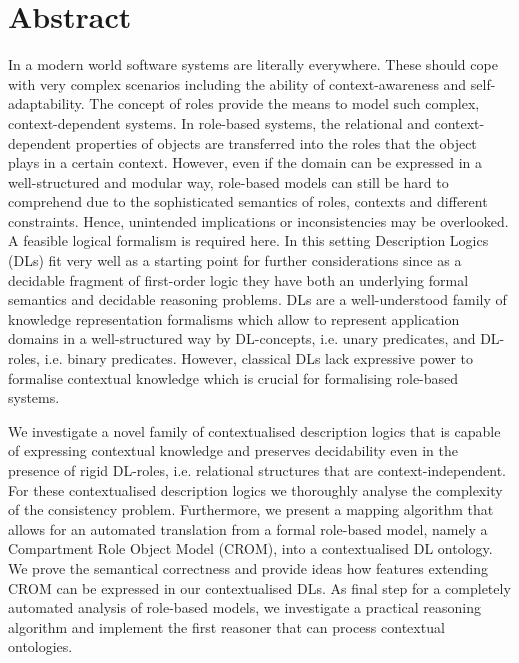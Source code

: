 
\chapter*{Abstract}
In a modern world software systems are literally everywhere. These should cope with very
complex scenarios including the ability of context-awareness and self-adaptability. The concept of
roles provide the means to model such complex, context-dependent systems. In role-based systems, the
relational and context-dependent properties of objects are transferred into the roles that the
object plays in a certain context. However, even if the domain can be expressed in a well-structured
and modular way, role-based models can still be hard to comprehend due to the sophisticated
semantics of roles, contexts and different constraints. Hence, unintended implications or
inconsistencies may be overlooked. A feasible logical formalism is required here. In this setting
Description Logics (DLs) fit very well as a starting point for further considerations since as a
decidable fragment of first-order logic they have both an underlying formal semantics and decidable
reasoning problems. DLs are a well-understood family of knowledge representation formalisms which
allow to represent application domains in a well-structured way by DL-concepts, i.e. unary
predicates, and DL-roles, i.e. binary predicates. However, classical DLs lack expressive power to
formalise contextual knowledge which is crucial for formalising role-based systems.

We investigate a novel family of contextualised description logics that is capable of expressing
contextual knowledge and preserves decidability even in the presence of rigid DL-roles,
i.e. relational structures that are context-independent. For these contextualised description logics
we thoroughly analyse the complexity of the consistency problem.  Furthermore, we present a mapping
algorithm that allows for an automated translation from a formal role-based model, namely a
Compartment Role Object Model (CROM), into a contextualised DL ontology. We prove the semantical
correctness and provide ideas how features extending CROM can be expressed in our contextualised
DLs. As final step for a completely automated analysis of role-based models, we investigate a
practical reasoning algorithm and implement the first reasoner that can process contextual
ontologies.



